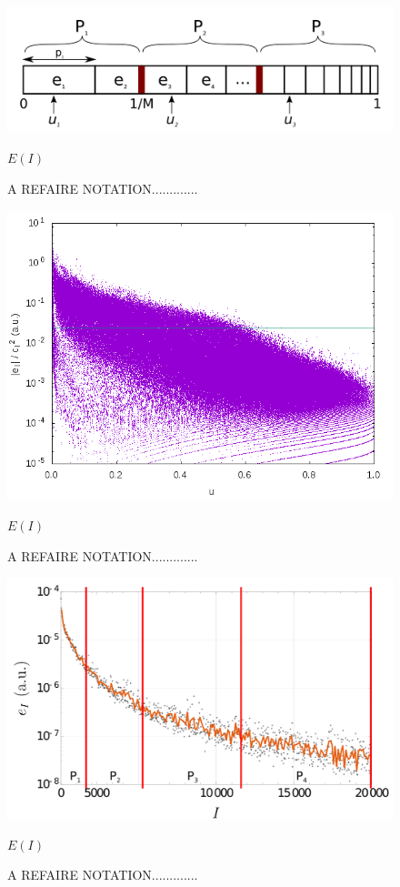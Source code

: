 \documentclass[./thesis.tex]{subfiles}
\begin{document}
\begin{figure}[h!]
	\begin{center}
		\includegraphics[width=0.9\columnwidth]{figures/pt2/comb}
		\caption{A REFAIRE NOTATION.............}
		\label{fig:comb}
		$E(I)$
	\end{center}
\end{figure}


\begin{figure}[h!]
	\begin{center}
		\includegraphics[width=0.9\columnwidth]{figures/pt2/eici2}
		\caption{A REFAIRE NOTATION.............}
		\label{fig:eici2}
		$E(I)$
	\end{center}
\end{figure}


\begin{figure}[h!]
	\begin{center}
		\includegraphics[width=0.9\columnwidth]{figures/pt2/P_i}
		\caption{A REFAIRE NOTATION.............}
		\label{fig:p_i}
		$E(I)$
	\end{center}
\end{figure}
\end{document}
